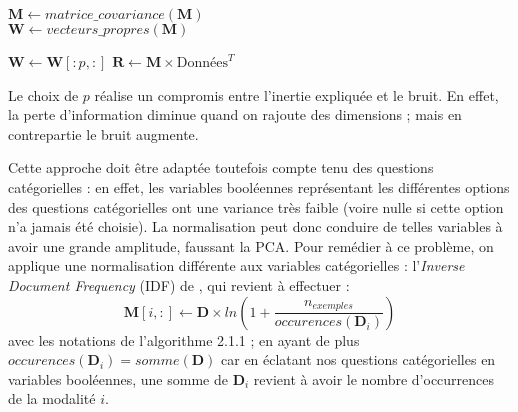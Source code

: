\documentclass[11pt,fleqn,openany,frenchb]{book} %
\begin{document}
\begin{definition}
\begin{algorithm}[H]
 \BlankLine
 \BlankLine
 $\mathbf{M}\leftarrow matrice\_covariance(\mathbf{M})$\\
 $\mathbf{W}\leftarrow vecteurs\_propres(\mathbf{M})$\\
 \BlankLine

 $\mathbf{W}\leftarrow \mathbf{W}[:p,:]$  
 $\mathbf{R}\leftarrow \mathbf{M} \times\textrm{Données}^T$\\
\label{alg:ACP}
\end{algorithm}

\end{definition}

Le choix de $p$ réalise un compromis entre l'inertie expliquée et le bruit. En effet, la perte d'information diminue quand on rajoute des dimensions ; mais en contrepartie le bruit augmente.\par

Cette approche doit être adaptée toutefois compte tenu des questions catégorielles : en effet, les variables booléennes représentant les différentes options des questions catégorielles ont une variance très faible (voire nulle si cette option n'a jamais été choisie). La normalisation peut donc conduire de telles variables à avoir une grande amplitude, faussant la PCA. Pour remédier à ce problème, on applique une normalisation différente aux variables catégorielles : l'\textit{Inverse Document Frequency} (IDF) de \cite{sparckjones1972}, qui revient à effectuer : 
$$\mathbf{M}[i,:]\leftarrow \mathbf{D} \times ln \left(1+\frac{n_{exemples}}{occurences(\mathbf{D}_i)}\right)  $$
avec les notations de l'algorithme 2.1.1 ; en ayant de plus $occurences(\mathbf{D}_i)=somme(\mathbf{D})$ car en éclatant nos questions catégorielles en variables booléennes, une somme de $\mathbf{D}_i$ revient à avoir le nombre d'occurrences de la modalité $i$.
\end{document}
